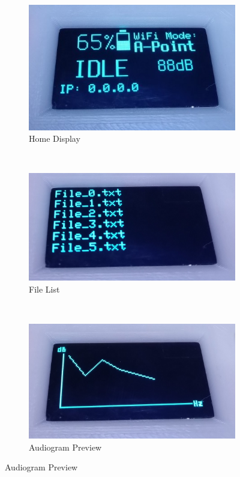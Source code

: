 \documentclass[a4paper,12pt,oneside,pdflatex,italian,final,twocolumn]{article}
\begin{document}
\begin{figure}[h]
    \centering
    \begin{subfigure}[b]{0.32\textwidth}
        \includegraphics[width=\textwidth]{images/display-home.jpg}
        \caption{Home Display}
    \end{subfigure}
    ~
    \begin{subfigure}[b]{0.32\textwidth}
        \includegraphics[width=\textwidth]{images/display-file.jpg}
        \caption{File List}
    \end{subfigure}
    ~
    \begin{subfigure}[b]{0.32\textwidth}
        \includegraphics[width=\textwidth]{images/display-plot.jpg}
        \caption{Audiogram Preview}
    \end{subfigure}
\end{figure}
\end{document}
